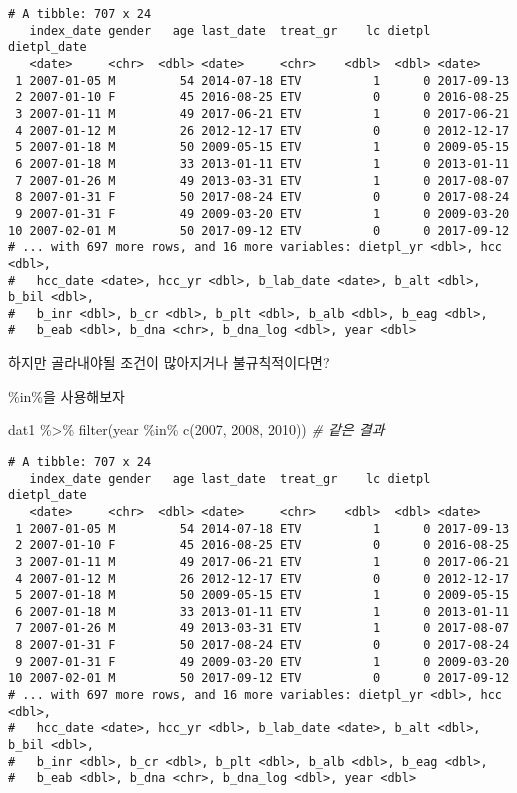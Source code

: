 \documentclass[
]{article}
\newenvironment{Shaded}{\begin{snugshade}}{\end{snugshade}}
\newcommand{\CommentTok}[1]{\textcolor[rgb]{0.56,0.35,0.01}{\textit{#1}}}
\newcommand{\DecValTok}[1]{\textcolor[rgb]{0.00,0.00,0.81}{#1}}
\newcommand{\FunctionTok}[1]{\textcolor[rgb]{0.00,0.00,0.00}{#1}}
\newcommand{\NormalTok}[1]{#1}
\newcommand{\SpecialCharTok}[1]{\textcolor[rgb]{0.00,0.00,0.00}{#1}}
\begin{document}
\begin{verbatim}
# A tibble: 707 x 24
   index_date gender   age last_date  treat_gr    lc dietpl dietpl_date
   <date>     <chr>  <dbl> <date>     <chr>    <dbl>  <dbl> <date>     
 1 2007-01-05 M         54 2014-07-18 ETV          1      0 2017-09-13 
 2 2007-01-10 F         45 2016-08-25 ETV          0      0 2016-08-25 
 3 2007-01-11 M         49 2017-06-21 ETV          1      0 2017-06-21 
 4 2007-01-12 M         26 2012-12-17 ETV          0      0 2012-12-17 
 5 2007-01-18 M         50 2009-05-15 ETV          1      0 2009-05-15 
 6 2007-01-18 M         33 2013-01-11 ETV          1      0 2013-01-11 
 7 2007-01-26 M         49 2013-03-31 ETV          1      0 2017-08-07 
 8 2007-01-31 F         50 2017-08-24 ETV          0      0 2017-08-24 
 9 2007-01-31 F         49 2009-03-20 ETV          1      0 2009-03-20 
10 2007-02-01 M         50 2017-09-12 ETV          0      0 2017-09-12 
# ... with 697 more rows, and 16 more variables: dietpl_yr <dbl>, hcc <dbl>,
#   hcc_date <date>, hcc_yr <dbl>, b_lab_date <date>, b_alt <dbl>, b_bil <dbl>,
#   b_inr <dbl>, b_cr <dbl>, b_plt <dbl>, b_alb <dbl>, b_eag <dbl>,
#   b_eab <dbl>, b_dna <chr>, b_dna_log <dbl>, year <dbl>
\end{verbatim}

하지만 골라내야될 조건이 많아지거나 불규칙적이다면?

\%in\%을 사용해보자

\begin{Shaded}
\begin{Highlighting}[]
\NormalTok{dat1 }\SpecialCharTok{\%\textgreater{}\%} 
   \FunctionTok{filter}\NormalTok{(year }\SpecialCharTok{\%in\%} \FunctionTok{c}\NormalTok{(}\DecValTok{2007}\NormalTok{, }\DecValTok{2008}\NormalTok{, }\DecValTok{2010}\NormalTok{)) }\CommentTok{\# 같은 결과}
\end{Highlighting}
\end{Shaded}

\begin{verbatim}
# A tibble: 707 x 24
   index_date gender   age last_date  treat_gr    lc dietpl dietpl_date
   <date>     <chr>  <dbl> <date>     <chr>    <dbl>  <dbl> <date>     
 1 2007-01-05 M         54 2014-07-18 ETV          1      0 2017-09-13 
 2 2007-01-10 F         45 2016-08-25 ETV          0      0 2016-08-25 
 3 2007-01-11 M         49 2017-06-21 ETV          1      0 2017-06-21 
 4 2007-01-12 M         26 2012-12-17 ETV          0      0 2012-12-17 
 5 2007-01-18 M         50 2009-05-15 ETV          1      0 2009-05-15 
 6 2007-01-18 M         33 2013-01-11 ETV          1      0 2013-01-11 
 7 2007-01-26 M         49 2013-03-31 ETV          1      0 2017-08-07 
 8 2007-01-31 F         50 2017-08-24 ETV          0      0 2017-08-24 
 9 2007-01-31 F         49 2009-03-20 ETV          1      0 2009-03-20 
10 2007-02-01 M         50 2017-09-12 ETV          0      0 2017-09-12 
# ... with 697 more rows, and 16 more variables: dietpl_yr <dbl>, hcc <dbl>,
#   hcc_date <date>, hcc_yr <dbl>, b_lab_date <date>, b_alt <dbl>, b_bil <dbl>,
#   b_inr <dbl>, b_cr <dbl>, b_plt <dbl>, b_alb <dbl>, b_eag <dbl>,
#   b_eab <dbl>, b_dna <chr>, b_dna_log <dbl>, year <dbl>
\end{verbatim}
\end{document}
